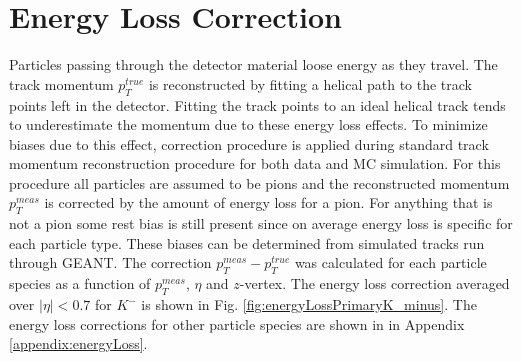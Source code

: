 

\chapter{Energy Loss Correction}\label{chap:energyLossCorrection}
Particles passing through the detector material loose energy as they travel. The track momentum $p_T^{true}$ is reconstructed by fitting a helical path to the track points left in the detector. Fitting the track points to an ideal
helical track tends to underestimate the momentum due to these energy loss effects. To minimize biases due to this effect, correction procedure is applied 
during standard track momentum reconstruction procedure for both data and MC simulation. For this procedure all particles are assumed to be pions and the reconstructed momentum $p_T^{meas}$ is corrected by the amount of energy loss for a pion.  For anything that is not a pion some rest bias  is still present since on average energy loss is specific for each particle type. These biases  can be determined from simulated tracks run through GEANT.
The correction $p_T^{meas}-p_T^{true}$ was calculated for each particle species as a function of $p_T^{meas}$, $\eta$ and $z$-vertex. The energy loss correction averaged over $|\eta|<0.7$ for $K^-$ is shown in Fig. \ref{fig:energyLossPrimaryK_minus}. 
\noindent The energy loss corrections for other particle species are shown in  in Appendix \ref{appendix:energyLoss}.\newline



